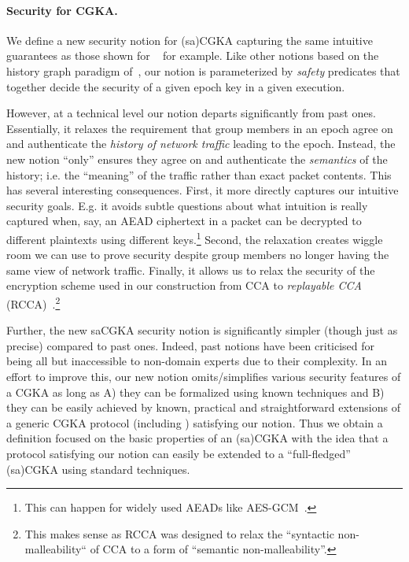 \paragraph{Security for CGKA.}
We define a new security notion for (sa)CGKA capturing the same intuitive
guarantees as those shown for \protITK~\cite{EPRINT:AlwJosMul20} for example.
Like other notions based on the history graph paradigm of~\cite{CCS:ACDT21},
our notion is parameterized by \emph{safety} predicates that together decide
the security of a given epoch key in a given execution.

However, at a technical level our notion departs significantly from past
ones. Essentially, it relaxes the requirement that group members in an epoch
agree on and authenticate the \emph{history of network traffic} leading to
the epoch. Instead, the new notion ``only'' ensures they agree on and
authenticate the \emph{semantics} of the history; i.e. the ``meaning'' of the
traffic rather than exact packet contents. This has several interesting
consequences. First, it more directly captures our intuitive security goals.
E.g. it avoids subtle questions about what intuition is really captured when,
say, an AEAD ciphertext in a packet can be decrypted to different plaintexts
using different keys.\footnote{This can happen for widely used AEADs like
AES-GCM~\cite{C:DGRW18}.
} Second, the relaxation creates wiggle
room we can use to prove security despite group members no longer having the
same view of network traffic. Finally, it allows us to relax the security of
the encryption scheme used in our construction from CCA to
\emph{replayable CCA} (RCCA)~\cite{C:CanKraNie03}.\footnote{This makes sense
as RCCA was designed to relax the ``syntactic non-malleability`` of CCA to a
form of ``semantic non-malleability''.}

Further, the new saCGKA security notion is significantly simpler (though just as
precise) compared to past ones. Indeed, past notions have been criticised for being
all but inaccessible to non-domain experts due to their complexity. In an
effort to improve this, our new notion omits/simplifies various security
features of a CGKA as long as A) they can be formalized using known
techniques and B) they can be easily achieved by known, practical and
straightforward extensions of a generic CGKA protocol (including \saik)
satisfying our notion. Thus we obtain a definition focused on the basic
properties of an (sa)CGKA with the idea that a protocol satisfying our notion
can easily be extended to a ``full-fledged'' (sa)CGKA using standard
techniques.

